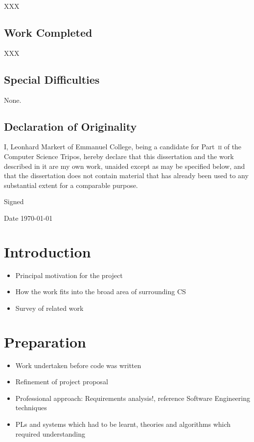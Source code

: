 \documentclass[11pt,chapterprefix=true,toc=bibliography]{scrreprt}
\begin{document}
XXX

\section*{Work Completed%
      \label{work-completed}%
}

XXX

\section*{Special Difficulties%
      \label{special-difficulties}%
}

None.

\section*{Declaration of Originality%
   \label{declaration-of-originality}%
}

I, Leonhard Markert of Emmanuel College, being a candidate for Part~\textsc{ii} of the Computer Science Tripos, hereby declare that this dissertation and the work described in it are my own work, unaided except as may be specified below, and that the dissertation does not contain material that has already been used to any substantial extent for a comparable purpose.

\vspace{0.3in}
Signed

\vspace{0.2in}
Date \hspace{0.4in} \today

\tableofcontents

\chapter{Introduction%
  \label{introduction}%
}

\begin{itemize}
    \item Principal motivation for the project
    \item How the work fits into the broad area of surrounding CS
    \item Survey of related work
\end{itemize}

\chapter{Preparation%
  \label{preparation}%
}

\begin{itemize}
    \item Work undertaken before code was written
    \item Refinement of project proposal
    \item Professional approach: Requirements analysis!, reference Software Engineering techniques
    \item PLs and systems which had to be learnt, theories and algorithms which required understanding
\end{itemize}
\end{document}
